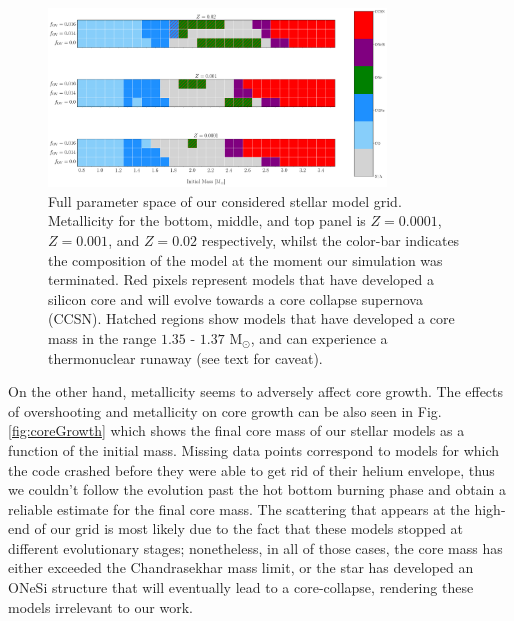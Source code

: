 \documentclass[../../main/thesis_msc.tex]{subfiles}
\begin{document}
   \begin{figure}[ht]
        \centering
        \includegraphics[width=0.8\textwidth]{../figures/chapter4/parameterSpaceRaster.png}
        \caption{Full parameter space of our considered stellar model grid. Metallicity for the bottom, middle, and top panel is $Z=0.0001$, $Z=0.001$, and $Z=0.02$ respectively, whilst the color-bar indicates the composition of the model at the moment our simulation was terminated. Red pixels represent models that have developed a silicon core and will evolve towards a core collapse supernova (CCSN). Hatched regions show models that have developed a core mass in the range $1.35$ - $1.37$ M$_{\odot}$, and can experience a thermonuclear runaway (see text for caveat).}
        \label{fig:parameterSpace}
    \end{figure}
    
    On the other hand, metallicity seems to adversely affect core growth. The effects of overshooting and metallicity on core growth can be also seen in Fig.\,\ref{fig:coreGrowth} which shows the final core mass of our stellar models as a function of the initial mass. Missing data points correspond to models for which the code crashed before they were able to get rid of their helium envelope, thus we couldn't follow the evolution past the hot bottom burning phase and obtain a reliable estimate for the final core mass. The scattering that appears at the high-end of our grid is most likely due to the fact that these models stopped at different evolutionary stages; nonetheless, in all of those cases, the core mass has either exceeded the Chandrasekhar mass limit, or the star has developed an ONeSi structure that will eventually lead to a core-collapse, rendering these models irrelevant to our work.
    
\end{document}
